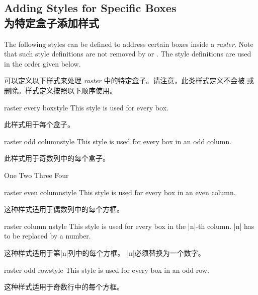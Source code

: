 
\subsection{Adding Styles for Specific Boxes\\为特定盒子添加样式}\label{subsec:raster_styles}

The following styles can be defined to address certain boxes inside
a \emph{raster}. Note that such style definitions are not removed by
 or .
The style definitions are used in the order given below.

可以定义以下样式来处理 \emph{raster} 中的特定盒子。请注意，此类样式定义不会被  或  删除。样式定义按照以下顺序使用。
\begin{docTcbKey}[][doc new=2014-11-24]{raster every box}{}{style}
This style is used for every box.

此样式用于每个盒子。
\end{docTcbKey}

\begin{docTcbKey}[][doc new=2014-11-10]{raster odd column}{}{style}
This style is used for every box in an odd column.

此样式用于奇数列中的每个盒子。
\begin{dispExample}
\begin{tcbitemize}[size=small,colframe=red!50!black,colback=red!10!white,
raster odd column/.style={colframe=blue!50!black,colback=blue!10!white}]
\tcbitem One
\tcbitem Two
\tcbitem Three
\tcbitem Four
\end{tcbitemize}
\end{dispExample}
\end{docTcbKey}

\begin{docTcbKey}[][doc new=2014-11-10]{raster even column}{}{style}
This style is used for every box in an even column.

这种样式适用于偶数列中的每个方框。
\end{docTcbKey}


\begin{docTcbKey}[][doc new=2014-11-10]{raster column n}{}{style}
This style is used for every box in the |n|-th column.
|n| has to be replaced by a number.

这种样式适用于第|n|列中的每个方框。 |n|必须替换为一个数字。
\end{docTcbKey}


\begin{docTcbKey}[][doc new=2014-11-10]{raster odd row}{}{style}
This style is used for every box in an odd row.

这种样式适用于奇数行中的每个方框。
\end{docTcbKey}

